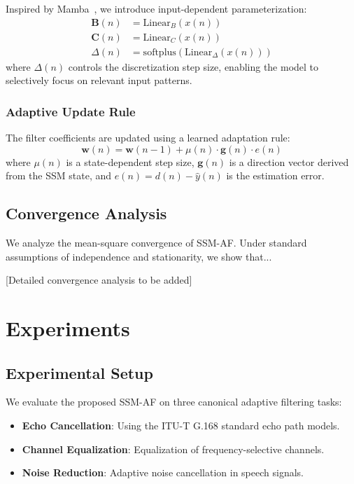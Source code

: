 \documentclass[a4paper,fleqn]{cas-sc}
\begin{document}
Inspired by Mamba~\citep{gu2023mamba}, we introduce input-dependent parameterization:
\begin{align}
\mathbf{B}(n) &= \text{Linear}_B(x(n)) \\
\mathbf{C}(n) &= \text{Linear}_C(x(n)) \\
\Delta(n) &= \text{softplus}(\text{Linear}_\Delta(x(n)))
\end{align}
where $\Delta(n)$ controls the discretization step size, enabling the model to selectively focus on relevant input patterns.

\subsubsection{Adaptive Update Rule}

The filter coefficients are updated using a learned adaptation rule:
\begin{equation}
\mathbf{w}(n) = \mathbf{w}(n-1) + \mu(n) \cdot \mathbf{g}(n) \cdot e(n)
\end{equation}
where $\mu(n)$ is a state-dependent step size, $\mathbf{g}(n)$ is a direction vector derived from the SSM state, and $e(n) = d(n) - \hat{y}(n)$ is the estimation error.

\subsection{Convergence Analysis}

We analyze the mean-square convergence of SSM-AF. Under standard assumptions of independence and stationarity, we show that...

[Detailed convergence analysis to be added]


\section{Experiments}\label{sec:experiments}

\subsection{Experimental Setup}

We evaluate the proposed SSM-AF on three canonical adaptive filtering tasks:

\begin{itemize}
\item \textbf{Echo Cancellation}: Using the ITU-T G.168 standard echo path models.
\item \textbf{Channel Equalization}: Equalization of frequency-selective channels.
\item \textbf{Noise Reduction}: Adaptive noise cancellation in speech signals.
\end{itemize}
\end{document}

